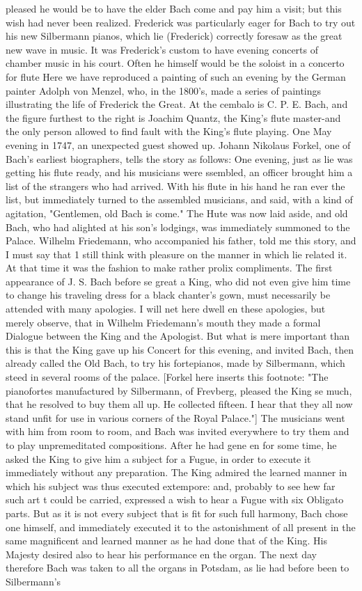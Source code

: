 pleased he would be to have the elder Bach come and pay him a visit; but this wish had never been realized. Frederick was particularly eager for Bach to try out his new Silbermann pianos, which lie (Frederick) correctly foresaw as the great new wave in music. It was Frederick's custom to have evening concerts of chamber music in his court. Often he himself would be the soloist in a concerto for flute Here we have reproduced a painting of such an evening by the German painter Adolph von Menzel, who, in the 1800's, made a series of paintings illustrating the life of Frederick the Great. At the cembalo is C. P. E. Bach, and the figure furthest to the right is Joachim Quantz, the King's flute master-and the only person allowed to find fault with the King's flute playing. One May evening in 1747, an unexpected guest showed up. Johann Nikolaus Forkel, one of Bach's earliest biographers, tells the story as follows: One evening, just as lie was getting his flute ready, and his musicians were ssembled, an officer brought him a list of the strangers who had arrived. With his flute in his hand he ran ever the list, but immediately turned to the assembled musicians, and said, with a kind of agitation, "Gentlemen, old Bach is come." The Hute was now laid aside, and old Bach, who had alighted at his son's lodgings, was immediately summoned to the Palace. Wilhelm Friedemann, who accompanied his father, told me this story, and I must say that 1 still think with pleasure on the manner in which lie related it. At that time it was the fashion to make rather prolix compliments. The first appearance of J. S. Bach before se great a King, who did not even give him time to change his traveling dress for a black chanter's gown, must necessarily be attended with many apologies. I will net here dwell en these apologies, but merely observe, that in Wilhelm Friedemann's mouth they made a formal Dialogue between the King and the Apologist. But what is mere important than this is that the King gave up his Concert for this evening, and invited Bach, then already called the Old Bach, to try his fortepianos, made by Silbermann, which steed in several rooms of the palace. [Forkel here inserts this footnote: "The pianofortes manufactured by Silbermann, of Frevberg, pleased the King se much, that he resolved to buy them all up. He collected fifteen. I hear that they all now stand unfit for use in various corners of the Royal Palace."] The musicians went with him from room to room, and Bach was invited everywhere to try them and to play unpremeditated compositions. After he had gene en for some time, he asked the King to give him a subject for a Fugue, in order to execute it immediately without any preparation. The King admired the learned manner in which his subject was thus executed extempore: and, probably to see hew far such art t could be carried, expressed a wish to hear a Fugue with six Obligato parts. But as it is not every subject that is fit for such full harmony, Bach chose one himself, and immediately executed it to the astonishment of all present in the same magnificent and learned manner as he had done that of the King. His Majesty desired also to hear his performance en the organ. The next day therefore Bach was taken to all the organs in Potsdam, as lie had before been to Silbermann's 
